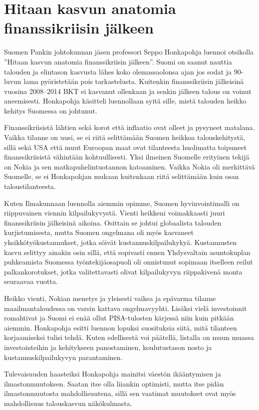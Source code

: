\documentclass[12pt]{article}
\begin{document}
\newpage
\section{Hitaan kasvun anatomia finanssikriisin jäl\-keen}

Suomen Pankin johtokunnan jäsen professori Seppo Honkapohja luennoi otsikolla
''Hitaan kasvun anatomia finanssikriisin jälkeen''. Suomi on saanut nauttia
talouden ja elintason kasvusta lähes koko olemassaolonsa ajan jos sodat ja
90-luvun lama pyöristetään pois tarkastelusta. Kuitenkin finanssikriisin
jälkeisinä vuosina 2008--2014 BKT ei kasvanut ollenkaan ja senkin jälkeen
talous on voinut aneemisesti. Honkapohja käsitteli luennollaan syitä sille,
mistä talouden heikko kehitys Suomessa on johtunut.

Finanssikriisistä lähtien sekä korot että inflaatio ovat olleet ja pysyneet
matalana. Vaikka tilanne on uusi, se ei riitä selittämään Suomen heikkoa
talouskehitystä, sillä sekä USA että muut Euroopan maat ovat tilanteesta
huolimatta toipuneet finanssikriisistä vähintään kohtuullisesti. Yksi ilmeinen
Suomelle erityinen tekijä on Nokia ja sen matkapuhelintuotannon katoaminen.
Vaikka Nokia oli merkittävä Suomelle, se ei Honkapohjan mukaan kuitenkaan riitä
selittämään kuin osan taloustilanteesta.

Kuten Ilmakunnaan luennolla aiemmin opimme, Suomen hyvinvointimalli on
riippuvainen viennin kilpailukyvystä. Vienti heikkeni voimakkaasti juuri
finanssikriisin jälkeisinä aikoina. Osittain se johtui globaalista talouden
kurjistumisesta, mutta Suomen ongelmana oli myös kasvaneet
yksikkötyökustannukset, jotka söivät kustannuskilpailukykyä. Kustannusten kasvu
selittyy ainakin osin sillä, että sopivasti ennen Yhdysvaltain asuntokuplan
puhkeamista Suomessa työntekijäosapuoli oli onnistunut sopimaan itselleen
reilut palkankorotukset, jotka valitettavasti olivat kilpailukyvyn riippakivenä
monta seuraavaa vuotta.

Heikko vienti, Nokian menetys ja yleisesti vaikea ja epävarma tilanne
maailmantaloudessa on varsin kattava ongelmavyyhti. Lisäksi vielä investoinnit
romahtivat ja Suomi ei enää ollut PISA-tulosten kärjessä niin kuin pitkään
aiemmin. Honkapohja esitti luennon lopuksi suosituksia siitä, mitä tilanteen
korjaamiseksi tulisi tehdä. Kuten edellisestä voi päätellä, listalla on muun
muassa investointeihin ja kehitykseen panostaminen, koulutustason nosto ja
kustannuskilpailukyvyn parantaminen.

Tulevaisuuden haasteiksi Honkapohja mainitsi väestön ikääntymisen ja
ilmastonmuutoksen. Saatan itse olla liiankin optimisti, mutta itse pidän
ilmastonmuutosta mahdollisuutena, sillä sen vaatimat muutokset ovat myös
mahdollisuus talouskasvun näkökulmasta.
\end{document}
